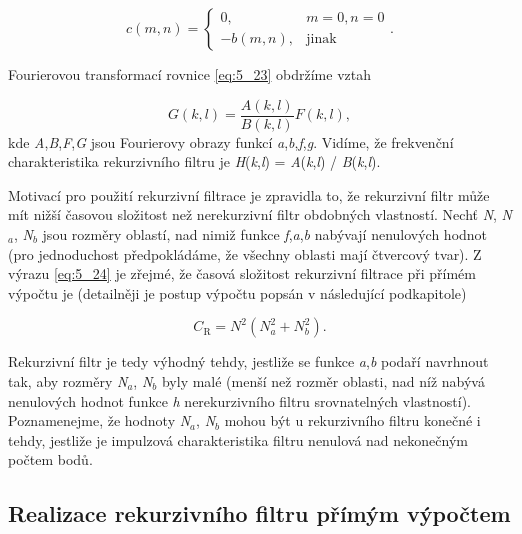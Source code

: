 \begin{equation} \label{eq:5_25}
    c(m, n) = \left\{
    \begin{array}{cc}
    0, & m = 0, n = 0 \\
    -b(m, n), & \mathrm{jinak}
    \end{array}
    \right. .
\end{equation}

Fourierovou transformací rovnice \eqref{eq:5_23} obdržíme vztah

\begin{equation} \label{eq:5_26}
    G(k, l) = \frac{A(k, l)}{B(k, l)} F(k, l),
\end{equation}
kde \textit{A},\textit{B},\textit{F},\textit{G} jsou Fourierovy obrazy funkcí \textit{a},\textit{b},\textit{f},\textit{g}. Vidíme, že frekvenční charakteristika rekurzivního filtru je \textit{H}(\textit{k},\textit{l}) = \textit{A}(\textit{k},\textit{l}) / \textit{B}(\textit{k},\textit{l}).

Motivací pro použití rekurzivní filtrace je zpravidla to, že rekurzivní filtr může mít nižší časovou složitost než nerekurzivní filtr obdobných vlastností. Nechť \textit{N}, \textit{N}$_a$, \textit{N}$_b$ jsou rozměry oblastí, nad nimiž funkce \textit{f},\textit{a},\textit{b} nabývají nenulových hodnot (pro jednoduchost předpokládáme, že všechny oblasti mají čtvercový tvar). Z výrazu \eqref{eq:5_24} je zřejmé, že časová složitost rekurzivní filtrace při přímém výpočtu je (detailněji je postup výpočtu popsán v následující podkapitole)

\begin{equation} \label{eq:5_27}
    C_\mathrm{R} = N^2 \left( N_a^2 + N_b^2 \right).
\end{equation}

Rekurzivní filtr je tedy výhodný tehdy, jestliže se funkce \textit{a},\textit{b} podaří navrhnout tak, aby rozměry \textit{N}$_a$, \textit{N}$_b$ byly malé (menší než rozměr oblasti, nad níž nabývá nenulových hodnot funkce \textit{h} nerekurzivního filtru srovnatelných vlastností). Poznamenejme, že hodnoty \textit{N}$_a$, \textit{N}$_b$ mohou být u rekurzivního filtru konečné i tehdy, jestliže je impulzová charakteristika filtru nenulová nad nekonečným počtem bodů.

\subsection*{Realizace rekurzivního filtru přímým výpočtem}


